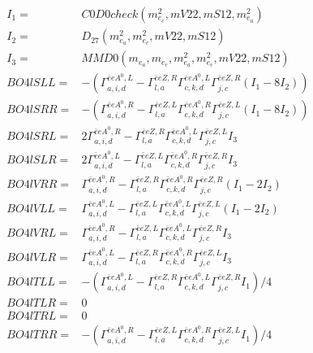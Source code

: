 \documentclass[A4,landscape]{article}
\begin{document}
\begin{align} 
I_1 = & C0D0check(m^2_{e_{{c}}}, mV22, mS12, m^2_{e_{{a}}}) \\ 
I_2 = & D_{27}(m^2_{e_{{a}}}, m^2_{e_{{c}}}, mV22, mS12) \\ 
I_3 = & MMD0(m_{e_{{a}}}, m_{e_{{c}}}, m^2_{e_{{a}}}, m^2_{e_{{c}}}, mV22, mS12) \\ 
  BO4lSLL= & -( \Gamma^{\bar{e}e A^0 ,L}_{a, i, d} - \Gamma^{\bar{e}e Z ,R} _{l, a} \Gamma^{\bar{e}e A^0 ,L}_{c, k, d} \Gamma^{\bar{e}e Z ,R}_{j, c} (I_1 - 8 I_2)) \\ 
  BO4lSRR= & -( \Gamma^{\bar{e}e A^0 ,R}_{a, i, d} - \Gamma^{\bar{e}e Z ,L} _{l, a} \Gamma^{\bar{e}e A^0 ,R}_{c, k, d} \Gamma^{\bar{e}e Z ,L}_{j, c} (I_1 - 8 I_2)) \\ 
  BO4lSRL= & 2  \Gamma^{\bar{e}e A^0 ,R}_{a, i, d} - \Gamma^{\bar{e}e Z ,R} _{l, a} \Gamma^{\bar{e}e A^0 ,L}_{c, k, d} \Gamma^{\bar{e}e Z ,L}_{j, c} I_3 \\ 
  BO4lSLR= & 2  \Gamma^{\bar{e}e A^0 ,L}_{a, i, d} - \Gamma^{\bar{e}e Z ,L} _{l, a} \Gamma^{\bar{e}e A^0 ,R}_{c, k, d} \Gamma^{\bar{e}e Z ,R}_{j, c} I_3 \\ 
  BO4lVRR= &  \Gamma^{\bar{e}e A^0 ,R}_{a, i, d} - \Gamma^{\bar{e}e Z ,R} _{l, a} \Gamma^{\bar{e}e A^0 ,R}_{c, k, d} \Gamma^{\bar{e}e Z ,R}_{j, c} (I_1 - 2 I_2) \\ 
  BO4lVLL= &  \Gamma^{\bar{e}e A^0 ,L}_{a, i, d} - \Gamma^{\bar{e}e Z ,L} _{l, a} \Gamma^{\bar{e}e A^0 ,L}_{c, k, d} \Gamma^{\bar{e}e Z ,L}_{j, c} (I_1 - 2 I_2) \\ 
  BO4lVRL= &  \Gamma^{\bar{e}e A^0 ,R}_{a, i, d} - \Gamma^{\bar{e}e Z ,L} _{l, a} \Gamma^{\bar{e}e A^0 ,L}_{c, k, d} \Gamma^{\bar{e}e Z ,R}_{j, c} I_3 \\ 
  BO4lVLR= &  \Gamma^{\bar{e}e A^0 ,L}_{a, i, d} - \Gamma^{\bar{e}e Z ,R} _{l, a} \Gamma^{\bar{e}e A^0 ,R}_{c, k, d} \Gamma^{\bar{e}e Z ,L}_{j, c} I_3 \\ 
  BO4lTLL= & -( \Gamma^{\bar{e}e A^0 ,L}_{a, i, d} - \Gamma^{\bar{e}e Z ,R} _{l, a} \Gamma^{\bar{e}e A^0 ,L}_{c, k, d} \Gamma^{\bar{e}e Z ,R}_{j, c} I_1)/4 \\ 
  BO4lTLR= & 0 \\ 
  BO4lTRL= & 0 \\ 
  BO4lTRR= & -( \Gamma^{\bar{e}e A^0 ,R}_{a, i, d} - \Gamma^{\bar{e}e Z ,L} _{l, a} \Gamma^{\bar{e}e A^0 ,R}_{c, k, d} \Gamma^{\bar{e}e Z ,L}_{j, c} I_1)/4 \\ 
\end{align} 
\end{document}
